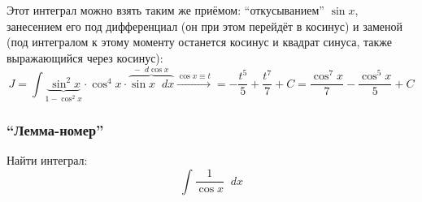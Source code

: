 \documentclass[a4paper,12pt]{article}
\newcommand{\diff}{\mathop{}\!d}
\begin{document}
  \begin{solution}
    Этот интеграл можно взять таким же приёмом: ``откусыванием'' $\sin x$, занесением его под дифференциал (он при этом перейдёт в косинус) и заменой (под интегралом к этому моменту останется косинус и квадрат синуса, также выражающийся через косинус):
    \[
      J = \int \underbrace{\:\sin^2 x}_{1 - \cos^2 x} \cdot \cos^4 x \cdot \overbrace{\sin x \diff x}^{-\diff \cos x} \xrightarrow{\cos x \equiv t} = -\frac{t^5}{5} + \frac{t^7}{7} + C = \frac{\cos^7 x}{7} - \frac{\cos^5 x}{5} + C
    \]




  \end{solution}


  \subsubsection{``Лемма-номер''}\label{seq:lemma-cos}

  Найти интеграл:
  \begin{equation}
    \int \frac{1}{\cos x} \diff x
  \end{equation}
  
\end{document}
